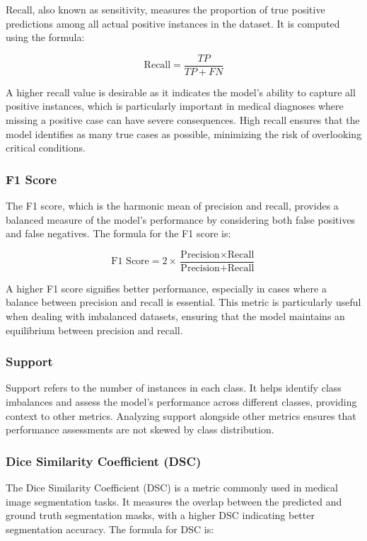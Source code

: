 Recall, also known as sensitivity, measures the proportion of true positive predictions among all actual positive instances in the dataset. It is computed using the formula:

\[
\text{Recall} = \frac{TP}{TP + FN}
\]

A higher recall value is desirable as it indicates the model's ability to capture all positive instances, which is particularly important in medical diagnoses where missing a positive case can have severe consequences. High recall ensures that the model identifies as many true cases as possible, minimizing the risk of overlooking critical conditions.

\subsubsection{F1 Score}

The F1 score, which is the harmonic mean of precision and recall, provides a balanced measure of the model's performance by considering both false positives and false negatives. The formula for the F1 score is:

\[
\text{F1 Score} = 2 \times \frac{\text{Precision} \times \text{Recall}}{\text{Precision} + \text{Recall}}
\]

A higher F1 score signifies better performance, especially in cases where a balance between precision and recall is essential. This metric is particularly useful when dealing with imbalanced datasets, ensuring that the model maintains an equilibrium between precision and recall.

\subsubsection{Support}

Support refers to the number of instances in each class. It helps identify class imbalances and assess the model's performance across different classes, providing context to other metrics. Analyzing support alongside other metrics ensures that performance assessments are not skewed by class distribution.

\subsubsection{Dice Similarity Coefficient (DSC)}

The Dice Similarity Coefficient (DSC) is a metric commonly used in medical image segmentation tasks. It measures the overlap between the predicted and ground truth segmentation masks, with a higher DSC indicating better segmentation accuracy. The formula for DSC is:


